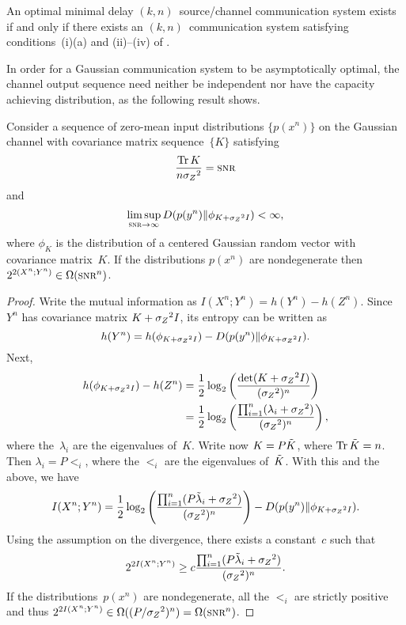 \begin{lemma}
  \label{lem:optcodenkexist}
  An optimal minimal delay $(k,n)$~source/channel communication system exists if
  and only if there exists an $(k,n)$~communication system satisfying
  conditions~(i)(a) and (ii)--(iv) of .
\end{lemma}

In order for a Gaussian communication system to be asymptotically optimal, the
channel output sequence need neither be independent nor have the capacity
achieving distribution, as the following result shows. 

\begin{lemma}
  \label{lem:asymptoptinputs}
  Consider a sequence of zero-mean input distributions $\{p(x^n)\}$ on the
  Gaussian channel with covariance matrix sequence~$\{K\}$ satisfying
  \begin{equation*}
    \frac{\Tr K}{n \szq} = \snr
  \end{equation*}
  and 
  \begin{equation*}
    \limsup_{\snr \goesto \infty} D(p(y^n) \| \phi_{K + \szq I}) < \infty,
  \end{equation*}
  where $\phi_K$ is the distribution of a centered Gaussian random vector with
  covariance matrix~$K$. If the distributions $p(x^n)$ are nondegenerate then
  $2^{2 (X^n; Y^n)} \in \Omega(\snr^n)$. 
\end{lemma}

\begin{proof}
  Write the mutual information as $I(X^n; Y^n) = h(Y^n) - h(Z^n)$. Since $Y^n$
  has covariance matrix $K + {{\sigma_Z}^2} I$, its entropy can be written
  as~\cite[Theorem~8.6.5]{CoverT1991}
  \begin{equation*}
    h(Y^n) = h(\phi_{K + {{\sigma_Z}^2} I}) - D(p(y^n) \| \phi_{K + {{\sigma_Z}^2} I}).
  \end{equation*}
  Next, 
  \begin{align*}
    h(\phi_{K + {{\sigma_Z}^2} I}) - h(Z^n) &= \frac12 \log_2 \left(
    \frac{\det(K + {{\sigma_Z}^2} I)}{({{\sigma_Z}^2})^n} \right) \\
    &= \frac12 \log_2 \left( \frac{{\prod_{i=1}^n} (\lambda_i + {{\sigma_Z}^2})}{({{\sigma_Z}^2})^n} \right),
  \end{align*}
  where the~$\lambda_i$ are the eigenvalues of~$K$. Write now $K = P \tilde{K}$, where
  $\operatorname{Tr} \tilde{K} = n$. Then $\lambda_i = P \lt_i$, where the $\lt_i$ are the
  eigenvalues of~$\tilde{K}$. With this and the above, we have
  \begin{equation*}
    I(X^n; Y^n) = \frac12 \log_2 \left(
    \frac{ {\prod_{i=1}^n}(P \tilde{\lambda}_i + {{\sigma_Z}^2})}{({{\sigma_Z}^2})^n} \right) - D(p(y^n) \| \phi_{K + {{\sigma_Z}^2}
    I}).
  \end{equation*}
  Using the assumption on the divergence, there exists a constant~$c$ such that
  \begin{equation*}
    2^{2 I(X^n; Y^n)} \ge c \frac{ {\prod_{i=1}^n}(P \tilde{\lambda}_i + {{\sigma_Z}^2})}{({{\sigma_Z}^2})^n}.
  \end{equation*}
  If the distributions~$p(x^n)$ are nondegenerate, all the $\lt_i$ are strictly
  positive and thus $2^{2 I(X^n; Y^n)} \in \Omega((P/\szq)^n) = \Omega(\snr^n)$.
\end{proof}

